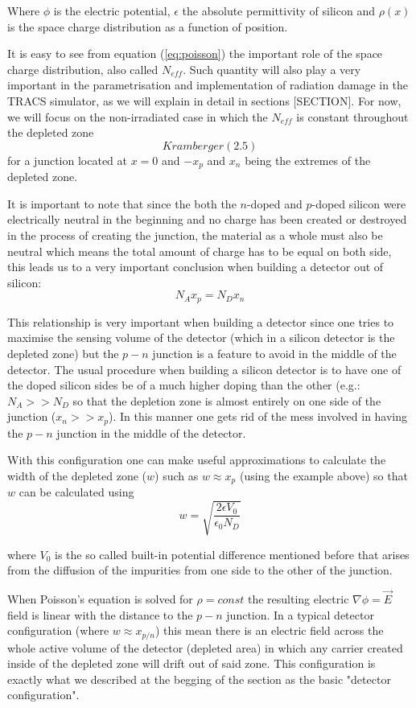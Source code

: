Where $\phi$ is the electric potential, $\epsilon$ the absolute permittivity of silicon and $\rho(x)$ is the space charge distribution as a function of position.

It is easy to see from equation (\ref{eq:poisson}) the important role of the space charge distribution, also called $N_{eff}$. Such quantity will also play a very important in the parametrisation and implementation of radiation damage in the TRACS simulator, as we will explain in detail in sections [SECTION]. For now, we will focus on the non-irradiated case in which the $N_{eff}$ is constant throughout the depleted zone \[ Kramberger (2.5)\] for a junction located at $x=0$ and $-x_p$ and $x_n$ being the extremes of the depleted zone.

It is important to note that since the both the $n$-doped and $p$-doped silicon were electrically neutral in the beginning and no charge has been created or destroyed in the process of creating the junction, the material as a whole must also be neutral which means the total amount of charge has to be equal on both side, this leads us to a very important conclusion when building a detector out of silicon: \[N_A x_p = N_D x_n\] 

This relationship is very important when building a detector since one tries to maximise the sensing volume of the detector (which in a silicon detector is the depleted zone) but the $p-n$ junction is a feature to avoid in the middle of the detector. The usual procedure when building a silicon detector is to have one of the doped silicon sides be of a much higher doping than the other (e.g.: $N_A >> N_D$  so that the depletion zone is almost entirely on one side of the junction ($x_n >> x_p$). In this manner one gets rid of the mess involved in having the $p-n$ junction in the middle of the detector.

With this configuration one can make useful approximations to calculate the width of the depleted zone ($w$) such as $w \approx x_p$  (using the example above) so that $w$ can be calculated using 
\begin{equation}
w = \sqrt{\frac{2\epsilon V_0}{\epsilon_0 N_D}}
\label{eq:width}
\end{equation}

where $V_0$ is the so called built-in potential difference mentioned before that arises from the diffusion of the impurities from one side to the other of the junction.

When Poisson's equation is solved for $\rho = const$ the resulting electric $\nabla \phi = \vec{E}$ field is linear with the distance to the $p-n$ junction. In a typical detector configuration (where $w \approx x_{p/n}$) this mean there is an electric field across the whole active volume of the detector (depleted area) in which any carrier created inside of the depleted zone will drift out of said zone. This configuration is exactly what we described at the begging of the section as the basic "detector configuration". 

